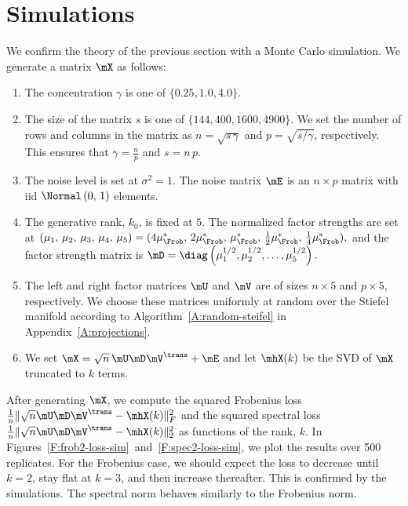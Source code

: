 \clearpage

\section{Simulations}\label{S:intrinsic-loss-simulations}

We confirm the theory of the previous section with a Monte Carlo simulation.  We generate a matrix $\mX$ as follows:
\begin{enumerate}
    \item The concentration $\gamma$ is one of $\{ 0.25, 1.0, 4.0 \}$.
    \item The size of the matrix $s$ is one of $\{ 144, 400, 1600, 4900 \}$.
        We set the number of rows and columns in the matrix as
        $n = \sqrt{ s \, \gamma }$ and $p = \sqrt{s / \gamma}$, respectively.
        This ensures that $\gamma = \frac{n}{p}$ and $s = n \, p$.
    \item The noise level is set at $\sigma^2 = 1$.  The noise matrix $\mE$
        is an $n \times p$ matrix with iid $\Normal\left( 0, \, 1\right)$
        elements.
    \item The generative rank, $k_0$, is fixed at $5$.  The normalized
        factor strengths are set at
        \(
            (
                \mu_1, \,
                \mu_2, \,
                \mu_3, \,
                \mu_4, \,
                \mu_5
            )
            =
            (
                4 \mu_\Frob^\ast, \,
                2 \mu_\Frob^\ast, \,
                  \mu_\Frob^\ast, \,
                \frac{1}{2} \mu_\Frob^\ast, \,
                \frac{1}{4} \mu_\Frob^\ast
            ),
        \)
        and the factor strength matrix is
        \(
            \mD 
            = 
            \diag\left( 
                \mu_1^{1/2},
                \mu_2^{1/2},
                \ldots, 
                \mu_5^{1/2}
            \right).
        \)
    \item The left and right factor matrices $\mU$ and $\mV$ are of sizes
        $n \times 5$ and $p \times 5$, respectively.  We choose these matrices
        uniformly at random over the Stiefel manifold according
        to Algorithm~\ref{A:random-steifel} in Appendix~\ref{A:projections}.
    \item We set $\mX = \sqrt{n} \, \mU \mD \mV^\trans + \mE$ and let
        $\mhX(k)$ be the SVD of $\mX$ truncated to $k$ terms.
\end{enumerate}
After generating $\mX$, we compute the squared Frobenius loss
\(
    \frac{1}{n} \| \sqrt{n}\mU \mD \mV^\trans - \mhX(k) \|_F^2
\)
and the squared spectral loss
\(
    \frac{1}{n} \| \sqrt{n}\mU \mD \mV^\trans - \mhX(k) \|_2^2
\)
as functions of the rank, $k$.  In 
Figures~\ref{F:frob2-loss-sim}~and~\ref{F:spec2-loss-sim}, we plot the results 
over 500 replicates.  For the Frobenius case, we should expect the loss to
decrease until $k=2$, stay flat at $k=3$, and then increase thereafter.  This 
is confirmed by the simulations.  The spectral norm behaves similarly to the 
Frobenius norm.


